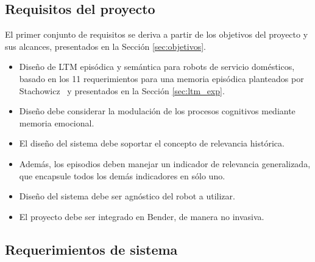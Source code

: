 \subsection{Requisitos del proyecto}

El primer conjunto de requisitos se deriva a partir de los objetivos del proyecto y sus alcances, presentados en la Sección \ref{sec:objetivos}.
\begin{itemize}
\item {} Diseño de LTM episódica y semántica para robots de servicio domésticos, basado en los 11 requerimientos para una memoria episódica planteados por Stachowicz~\cite{Stachowicz2012} y presentados en la Sección \ref{sec:ltm_exp}.
\item {} Diseño debe considerar la modulación de los procesos cognitivos mediante memoria emocional.
\item {} El diseño del sistema debe soportar el concepto de relevancia histórica.
\item {} Además, los episodios deben manejar un indicador de relevancia generalizada, que encapsule todos los demás indicadores en sólo uno.
\item {} Diseño del sistema debe ser agnóstico del robot a utilizar.
\item {} El proyecto debe ser integrado en Bender, de manera no invasiva.
\end{itemize}


\subsection{Requerimientos de sistema}

